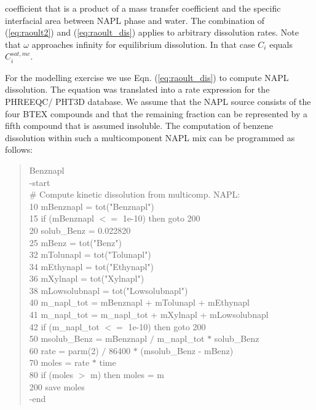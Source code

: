 coefficient that is a product of a mass transfer coefficient and
the specific interfacial area between NAPL phase and water. The
combination of (\ref{eq:raoult2}) and (\ref{eq:raoult_dis})
applies to arbitrary dissolution rates. Note that $\omega$
approaches infinity for equilibrium dissolution. In that case
$C_{i}$ equals $C_{i}^{sat,mc}$.
\par For the modelling exercise we use Eqn. (\ref{eq:raoult_dis}) to
compute NAPL dissolution. The equation was translated into a rate expression 
for the PHREEQC/ PHT3D database. We assume that the NAPL source
consists of the four BTEX compounds and that the remaining 
fraction can be represented by a fifth compound that is 
assumed insoluble. The computation of benzene 
dissolution within such a multicomponent NAPL mix can be programmed
as follows:
\\
{\color{red}
\begin{quote}
Benznapl \\
  -start  \\
\#  Compute kinetic dissolution from multicomp. NAPL: \\
   10  mBenznapl = tot("Benznapl")    \\
   15  if (mBenznapl $<=$ 1e-10) then goto 200  \\
   20  solub\_Benz = 0.022820  \\
   25  mBenz = tot("Benz")  \\
   32  mTolunapl = tot("Tolunapl")  \\
   34  mEthynapl = tot("Ethynapl")  \\
   36  mXylnapl  = tot("Xylnapl")  \\
   38  mLowsolubnapl  = tot("Lowsolubnapl")  \\
   40  m\_napl\_tot = mBenznapl + mTolunapl + mEthynapl \\
   41  m\_napl\_tot = m\_napl\_tot + mXylnapl + mLowsolubnapl  \\
   42  if (m\_napl\_tot $<=$ 1e-10) then goto 200  \\
   50  msolub\_Benz =  mBenznapl $/$ m\_napl\_tot $*$ solub\_Benz  \\
   60  rate = parm(2) $/$ 86400  $*$ (msolub\_Benz - mBenz)\\                                   
   70  moles = rate $*$ time  \\
   80  if (moles $>$ m) then moles = m  \\
   200 save moles\\
  -end  \\
 \end{quote}
 }
 
